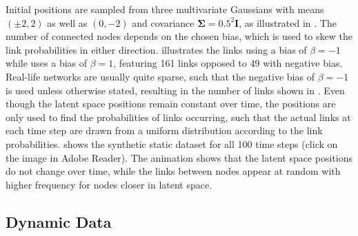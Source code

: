     Initial positions are sampled from three multivariate Gaussians with means $(\pm2,2)$ as well as $(0,-2)$ and covariance $\bm{\Sigma}=0.5^2\bm{I}$, as illustrated in . 
    The number of connected nodes depends on the chosen bias, which is used to skew the link probabilities in either direction.  illustrates the links using a bias of $\beta=-1$ while  uses a bias of $\beta=1$, featuring 161 links opposed to 49 with negative bias.
    Real-life networks are usually quite sparse, such that the negative bias of $\beta=-1$ is used unless otherwise stated, resulting in the number of links shown in . Even though the latent space positions remain constant over time, the positions are only used to find the probabilities of links occurring, such that the actual links at each time step are drawn from a uniform distribution according to the link probabilities.
     shows the synthetic static dataset for all 100 time steps (click on the image in Adobe Reader). The animation shows that the latent space positions do not change over time, while the links between nodes appear at random with higher frequency for nodes closer in latent space.

\subsection{Dynamic Data}


